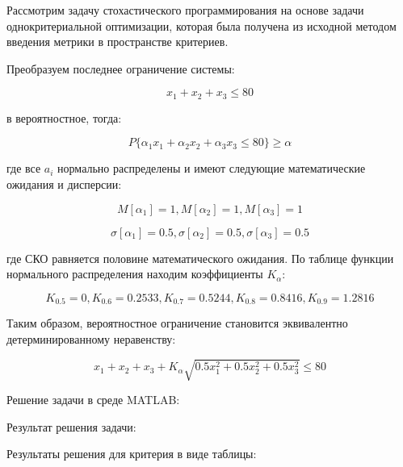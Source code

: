 \documentclass[14pt,a4paper,report]{report}
\begin{document}
Рассмотрим задачу стохастического программирования на основе задачи однокритериальной оптимизации, которая была получена из исходной методом введения метрики в пространстве критериев.

Преобразуем последнее ограничение системы:

\begin{equation*}
\text{$x_1+x_2+x_3\leq 80$}
\end{equation*}

в вероятностное, тогда:

\begin{equation*}
\text{$P\{\alpha_1x_1+\alpha_2x_2+\alpha_3x_3\leq 80\}\geq \alpha$}
\end{equation*}

где все $a_i$ нормально распределены и имеют следующие математические ожидания и дисперсии:

\begin{equation*}
\text{$M[\alpha_1]=1, M[\alpha_2]=1, M[\alpha_3]=1$}
\end{equation*}

\begin{equation*}
\text{$\sigma[\alpha_1]=0.5, \sigma[\alpha_2]=0.5, \sigma[\alpha_3]=0.5$}
\end{equation*}

где СКО равняется половине математического ожидания. По таблице функции нормального распределения находим коэффициенты $K_\alpha$:

\begin{equation*}
\text{$K_{0.5}=0, K_{0.6}=0.2533, K_{0.7}=0.5244, K_{0.8}=0.8416, K_{0.9}=1.2816$}
\end{equation*}

Таким образом, вероятностное ограничение становится эквивалентно детерминированному неравенству:

\begin{equation*}
\text{$x_1+x_2+x_3+K_\alpha \sqrt{0.5x_1^2+0.5x_2^2+0.5x_3^2}\leq 80$}
\end{equation*}

Решение задачи в среде MATLAB:





Результат решения задачи:



Результаты решения для критерия в виде таблицы:
\end{document}
